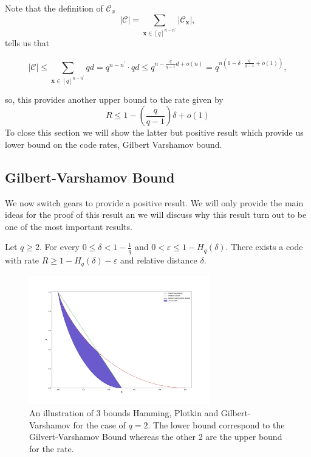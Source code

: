 \indent Note that the definition of $\mathcal{C}_{x}$
\begin{equation}
|\mathcal{C}|=\sum_{\mathbf{x} \in[q]^{n-n^{\prime}}}\left|\mathcal{C}_{\mathbf{x}}\right|,
\end{equation}
tells us that 

\begin{equation}
\left.|\mathcal{C}| \leq \sum_{\mathbf{x} \in[q]^{n-n^{\prime}}} q d=q^{n-n^{\prime}} \cdot q d \leq q^{n-\frac{q}{q-1} d+o(n)}=q^{n\left(1-\delta \cdot \frac{q}{q-1}+o(1)\right)}\right.,
\end{equation}

so, this provides another upper bound to the rate given by
\begin{equation}
R \leq 1-\left(\frac{q}{q-1}\right) \delta+o(1)
\label{CH2:Plotkin:bound_rate}
\end{equation}
\indent To close this section we will show the latter but positive result which provide us  lower bound on the code rates, Gilbert Varshamov bound.
\subsection{Gilbert-Varshamov Bound}
We now switch gears to provide a positive result. We will only provide the main ideas for the proof of this result an we will discuss why this result turn out to be one of the most important results.
\begin{definition}
Let $q\geq 2$. For every $0 \leq \delta<1-\frac{1}{q}$ and $0<\varepsilon \leq 1-H_{q}(\delta)$. There exists a code with rate $R \geq 1-H_{q}(\delta)-\varepsilon$ and relative distance $\delta$.
\label{CH2:Definition_Gilbert_Varshamov}
\end{definition}

\begin{figure}
\centering
\includegraphics[width=0.7\textwidth]{Figures/Hamming_plotkin_Gilbert_bound.png}
\caption{An illustration of 3 bounds Hamming, Plotkin and Gilbert-Varshamov for the case of $q=2$. The lower bound correspond to the Gilvert-Varshamov Bound whereas the other 2 are the upper bound for the rate.}
\end{figure}

